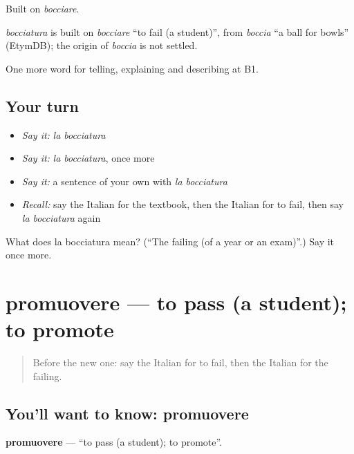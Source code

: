 Built on \emph{bocciare}.

\begin{cousinweb}
\emph{bocciatura} is built on \emph{bocciare} \textquotedblleft{}to fail (a student)\textquotedblright{}, from \emph{boccia} \textquotedblleft{}a ball for bowls\textquotedblright{} (EtymDB); the origin of \emph{boccia} is not settled.
\end{cousinweb}

\begin{grammarlens}[title={What you've built}]
One more word for telling, explaining and describing at B1.
\end{grammarlens}

\subsection*{Your turn}
\begin{itemize}
\raggedright
  \item \emph{Say it:} \emph{la bocciatura}
  \item \emph{Say it:} \emph{la bocciatura}, once more
  \item \emph{Say it:} a sentence of your own with \emph{la bocciatura}
  \item \emph{Recall:} say the Italian for the textbook, then the Italian for to fail, then say \emph{la bocciatura} again
\end{itemize}

\begin{tcolorbox}[breakable,colback=teal!4,colframe=teal!35!black,title={Before you move on}]
What does la bocciatura mean? (\textquotedblleft{}The failing (of a year or an exam)\textquotedblright{}.) Say it once more.
\end{tcolorbox}
\section[promuovere]{promuovere — to pass (a student); to promote}

\label{lesson:IT-C383-promuovere}



\begin{quote}
Before the new one: say the Italian for to fail, then the Italian for the failing.
\end{quote}

\subsection*{You'll want to know: promuovere}
\textbf{promuovere} — \textquotedblleft{}to pass (a student); to promote\textquotedblright{}.

